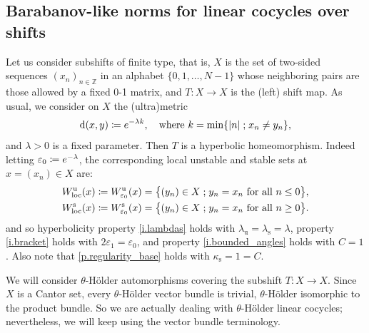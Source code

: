 \documentclass[JEP,XML,SOM,Unicode]{cedram}
\def\vcentcolon{\mathrel{\mathop\ordinarycolon}}
\providecommand\ordinarycolon{:}
\providecommand*\coloneqq{\vcentcolon\mathrel{\mkern-1.2mu}=}
\theoremstyle{plain}
\theoremstyle{definition}
\newcommand{\ZZ}{\mathbb{Z}}
\newcommand{\st}{\;\mathord{;}\;}
\newcommand{\dd}{\mathrm{d}}
\newcommand{\uu}{\mathrm{u}}
\renewcommand{\ss}{\mathrm{s}}
\let\epsilon\varepsilon
\begin{document}
\subsection{Barabanov-like norms for linear cocycles over shifts}\label{ss.Barabanov}

Let us consider subshifts of finite type, that is, $X$ is the set of two-sided sequences $(x_n)_{n\in \ZZ}$ in an alphabet $\{0,1,\dots, N-1\}$ whose neighboring pairs are those allowed by a fixed 0-1 matrix, and $T \colon X \to X$ is the (left) shift map.
As usual, we consider on $X$ the (ultra)metric
\begin{equation}\label{e.ultrametric}
\dd(x,y) \coloneqq e^{-\lambda k}, \quad \text{where } k = \min \{|n| \st x_n \neq y_n \},
\end{equation}
and $\lambda>0$ is a fixed parameter.
Then $T$ is a hyperbolic homeomorphism.
Indeed letting $\epsilon_0 \coloneqq e^{-\lambda}$, the corresponding local unstable and stable sets at $x=(x_n) \in X$ are:
\begin{align*}
W_\mathrm{loc}^\uu (x) &\coloneqq W_{\epsilon_0}^\uu (x) = \big\{ (y_n) \in X \st y_n = x_n \text{ for all } n\le 0\big\}, \\
W_\mathrm{loc}^\ss (x) &\coloneqq W_{\epsilon_0}^\ss (x) = \big\{ (y_n) \in X \st y_n = x_n \text{ for all } n\ge 0\big\}.
\end{align*}
and so hyperbolicity property \eqref{i.lambdas} holds with $\lambda_\uu = \lambda_\ss = \lambda$,
property \eqref{i.bracket} holds with $2\epsilon_1 = \epsilon_0$,
and property \eqref{i.bounded_angles} holds with $C=1$.
Also note that \cref{p.regularity_base} holds with $\kappa_\ss = 1 = C$.

We will consider $\theta$-Hölder automorphisms covering the subshift $T \colon X \to X$.
Since~$X$ is a Cantor set, every $\theta$-Hölder vector bundle is trivial, \ie $\theta$-Hölder isomorphic to the product bundle.
So we are actually dealing with $\theta$-Hölder linear cocycles; nevertheless, we will keep using the vector bundle terminology.
\end{document}
